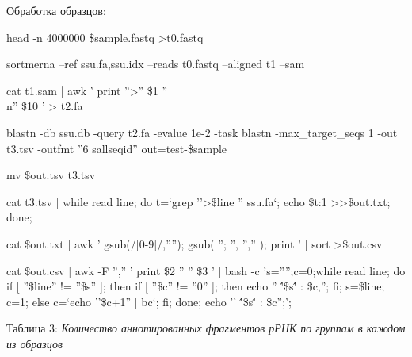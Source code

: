 \documentclass[a4paper]{article}
\begin{document}
Обработка образцов:

head -n 4000000 \$sample.fastq >t0.fastq

sortmerna --ref ssu.fa,ssu.idx --reads t0.fastq --aligned t1 --sam

cat t1.sam | awk '{ print ''>'' \$1 ''\\n'' \$10 }' > t2.fa

blastn -db ssu.db -query t2.fa -evalue 1e-2 -task blastn -max\_target\_seqs 1 -out t3.tsv -outfmt ''6 sallseqid''
out=test-\${sample}

mv \${out}.tsv t3.tsv

cat t3.tsv | while read line; do t=`grep ''>\$line '' ssu.fa`; echo \${t:1} >>\$out.txt; done;

cat \$out.txt | awk '{ gsub(/[0-9]/,''''); gsub( ''; '', '','' ); print }' | sort >\${out}.csv

cat \$out.csv | awk -F '','' '{ print \$2 '' '' \$3 }' | bash -c 's='''';c=0;while read line; do if [ ''\$line'' != ''\$s'' ]; then if [ ''\$c'' != ''0'' ]; then echo ''  \''\$s\'' : \$c,''; fi; s=\$line; c=1; else c=`echo ''\$c+1'' | bc`; fi; done; echo ''  \''\$s\'' : \$c'';'; 

 

Таблица 3: \textit{Количество аннотированных фрагментов рРНК по группам в каждом из образцов}
\end{document}
